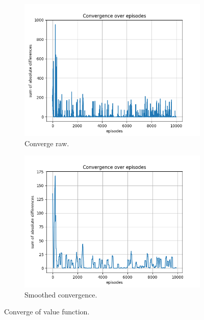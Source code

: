 \documentclass{assignment}
\begin{document}
\begin{figure}[H]
    \begin{subfigure}{0.5\textwidth}
        \includegraphics[width=\textwidth]{figures/convergence_td/alpha_sweep/convergence_TD_alpha_1_gamma_0.95_epislon_0.2.png}
    \caption{Converge raw.}
    \end{subfigure}\hfill
    \begin{subfigure}{0.5\textwidth}
        \includegraphics[width=\textwidth]{figures/convergence_td/alpha_sweep/convergence_TD_smoothed_alpha_1_gamma_0.95_epislon_0.2.png}
    \caption{Smoothed convergence.}
    \end{subfigure}
    \caption{Converge of value function.}
    \label{fig:alpha_1_td_learning_convergence}
\end{figure}
\end{document}
